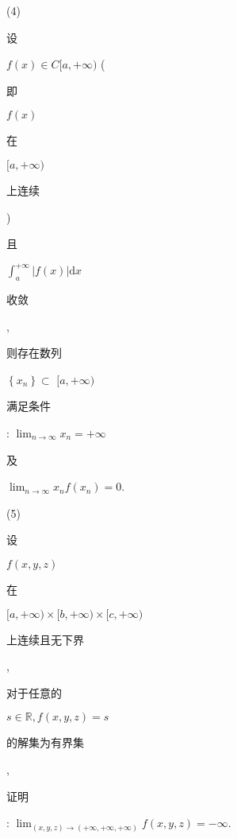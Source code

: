 \documentclass[10pt]{article}
\begin{document}
(4) \begin{CJK}{UTF8}{mj}设\end{CJK} $f(x) \in C[a,+\infty)$ (\begin{CJK}{UTF8}{mj}即\end{CJK} $f(x)$ \begin{CJK}{UTF8}{mj}在\end{CJK} $[a,+\infty)$ \begin{CJK}{UTF8}{mj}上连续\end{CJK}) \begin{CJK}{UTF8}{mj}且\end{CJK} $\int_{a}^{+\infty}|f(x)| \mathrm{d} x$ \begin{CJK}{UTF8}{mj}收敛\end{CJK}, \begin{CJK}{UTF8}{mj}则存在数列\end{CJK} $\left\{x_{n}\right\} \subset$ $[a,+\infty)$ \begin{CJK}{UTF8}{mj}满足条件\end{CJK}: $\lim _{n \rightarrow \infty} x_{n}=+\infty$ \begin{CJK}{UTF8}{mj}及\end{CJK} $\lim _{n \rightarrow \infty} x_{n} f\left(x_{n}\right)=0$.

(5) \begin{CJK}{UTF8}{mj}设\end{CJK} $f(x, y, z)$ \begin{CJK}{UTF8}{mj}在\end{CJK} $[a,+\infty) \times[b,+\infty) \times[c,+\infty)$ \begin{CJK}{UTF8}{mj}上连续且无下界\end{CJK}, \begin{CJK}{UTF8}{mj}对于任意的\end{CJK} $s \in \mathbb{R}, f(x, y, z)=s$ \begin{CJK}{UTF8}{mj}的解集为有界集\end{CJK}, \begin{CJK}{UTF8}{mj}证明\end{CJK}: $\lim _{(x, y, z) \rightarrow(+\infty,+\infty,+\infty)} f(x, y, z)=-\infty$.
\end{document}
